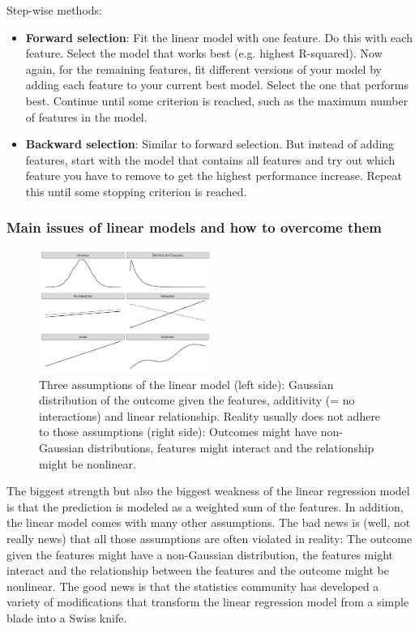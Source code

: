 Step-wise methods:
\begin{itemize}
    \item \textbf{Forward selection}: Fit the linear model with one feature. Do this with each feature. Select the model that works best (e.g. highest R-squared). Now again, for the remaining features, fit different versions of your model by adding each feature to your current best model. Select the one that performs best. Continue until some criterion is reached, such as the maximum number of features in the model.
    \item \textbf{Backward selection}: Similar to forward selection. But instead of adding features, start with the model that contains all features and try out which feature you have to remove to get the highest performance increase. Repeat this until some stopping criterion is reached.
\end{itemize}

\subsubsection{Main issues of linear models and how to overcome them}
\begin{figure}[H]
    \includegraphics[width=0.5\textwidth]{img/three-lm-problems-1.jpeg}
    \centering
    \caption{Three assumptions of the linear model (left side): Gaussian distribution of the outcome given the features, additivity (= no interactions) and linear relationship. Reality usually does not adhere to those assumptions (right side): Outcomes might have non-Gaussian distributions, features might interact and the relationship might be nonlinear.}
\end{figure}
The biggest strength but also the biggest weakness of the linear regression model is that the prediction is modeled as a weighted sum of the features. In addition, the linear model comes with many other assumptions. The bad news is (well, not really news) that all those assumptions are often violated in reality: The outcome given the features might have a non-Gaussian distribution, the features might interact and the relationship between the features and the outcome might be nonlinear. The good news is that the statistics community has developed a variety of modifications that transform the linear regression model from a simple blade into a Swiss knife.

